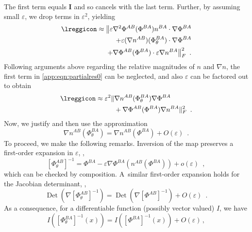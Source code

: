 The first term equals $\mathbf{I}$ and so cancels with the last term. Further,
by assuming small $\varepsilon$, we drop terms in $\varepsilon ^2$, yielding
\begin{equation}
	\begin{split}
		\lreggicon \approx \bigl\|
		\varepsilon \nabla^2 \Phi^{AB}(\Phi^{BA}) n^{BA} \cdot \nabla\Phi^{BA} \\ +
		\varepsilon (\nabla n^{AB}) (\Phi_\theta^{BA}) \cdot \nabla\Phi^{BA}  \\ +
		\nabla \Phi^{AB}(\Phi^{BA}) \cdot \varepsilon \nabla n^{BA} \bigr\|_F^2\enspace.
	\end{split}
	\label{app:eqn:partialres0}
\end{equation}
Following arguments above regarding the relative magnitudes of $n$ and $\nabla n$, the first term in \ref{app:eqn:partialres0} can be neglected, and also $\varepsilon$ can be factored out to obtain
\begin{equation}
	\begin{split}
		\lreggicon \approx \varepsilon^2 \| & \nabla n^{AB}( \Phi_\theta^{BA}) \nabla \Phi^{BA} \\
		& + \nabla \Phi^{AB}(\Phi^{BA})  \nabla n^{BA}\|_F^2\enspace.
	\end{split}
\end{equation}
\noindent Now, we justify and then use the approximation
\begin{equation}
	\nabla n^{AB}(\Phi_\theta^{BA}) = \nabla n^{AB}(\Phi^{BA}) + O(\varepsilon)\enspace.
\end{equation}
To proceed, we make the following remarks. Inversion of the map preserves a first-order expansion in $\varepsilon$, \ie,
\begin{equation}\label{EqFormulaInverseFirstOrder}
	[\Phi_\theta^{AB}]^{-1} = \Phi^{BA} -\varepsilon \nabla \Phi^{BA}(n^{AB}(\Phi^{BA})) + o(\varepsilon)\enspace,
\end{equation}
which can be checked by composition. A similar first-order expansion holds for the Jacobian determinant, \ie,
\begin{equation}\label{EqJacobianApproximation}
	\operatorname{Det}(\nabla [\Phi_\theta^{AB}]^{-1}) = \operatorname{Det}(\nabla [\Phi^{AB}]^{-1}) + O(\varepsilon)\enspace.
\end{equation}
As a consequence, for a differentiable function (possibly vector valued) $I$, we have
\begin{equation}
	I([\Phi_\theta^{BA}]^{-1}(x)) = I([\Phi^{BA}]^{-1}(x)) + O(\varepsilon)\,,
\end{equation}
